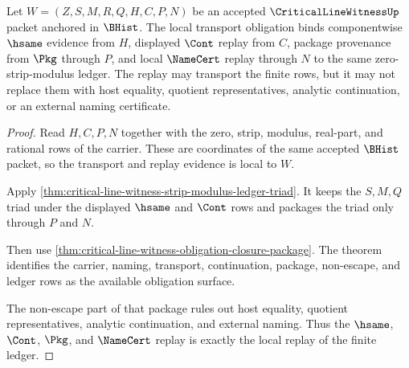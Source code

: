 \begin{theorem}
\label{thm:critical-line-witness-hsame-cont-ledger-obligation}
Let $W=(Z,S,M,R,Q,H,C,P,N)$ be an accepted $\CriticalLineWitnessUp$ packet anchored in $\BHist$. The local transport obligation binds componentwise $\hsame$ evidence from $H$, displayed $\Cont$ replay from $C$, package provenance from $\Pkg$ through $P$, and local $\NameCert$ replay through $N$ to the same zero-strip-modulus ledger. The replay may transport the finite rows, but it may not replace them with host equality, quotient representatives, analytic continuation, or an external naming certificate.
\end{theorem}
\begin{proof}
Read $H,C,P,N$ together with the zero, strip, modulus, real-part, and rational rows of the carrier. These are coordinates of the same accepted $\BHist$ packet, so the transport and replay evidence is local to $W$.

Apply \autoref{thm:critical-line-witness-strip-modulus-ledger-triad}. It keeps the $S,M,Q$ triad under the displayed $\hsame$ and $\Cont$ rows and packages the triad only through $P$ and $N$.

Then use \autoref{thm:critical-line-witness-obligation-closure-package}. The theorem identifies the carrier, naming, transport, continuation, package, non-escape, and ledger rows as the available obligation surface.

The non-escape part of that package rules out host equality, quotient representatives, analytic continuation, and external naming. Thus the $\hsame$, $\Cont$, $\Pkg$, and $\NameCert$ replay is exactly the local replay of the finite ledger.
\end{proof}




